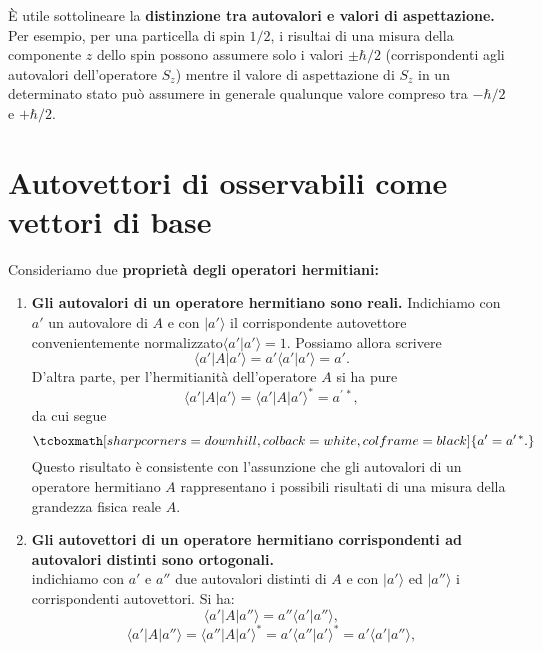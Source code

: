 È utile sottolineare la \textbf{distinzione tra autovalori e valori di aspettazione.} Per esempio, per una particella di spin $1/2$, i risultai di una misura della componente $z$ dello spin possono assumere solo i valori $\pm \hbar/2$ (corrispondenti agli autovalori dell'operatore $S_z$) mentre il valore di aspettazione di $S_z$ in un determinato stato può assumere in generale qualunque valore compreso tra $-\hbar /2$ e $+\hbar /2$.
\section{Autovettori di osservabili come vettori di base}
Consideriamo due \textbf{proprietà degli operatori hermitiani:}
\begin{enumerate}
\item \textbf{Gli autovalori di un operatore hermitiano sono reali.} Indichiamo con $a'$ un autovalore di $A$ e con $\vert a' \rangle $ il corrispondente autovettore convenientemente normalizzato$\langle a' \vert a' \rangle =1 $. Possiamo allora scrivere
	\begin{equation}
		\langle a' \vert A \vert a' \rangle = a' \langle a' \vert a' \rangle = a'.
	\end{equation}
D'altra parte, per l'hermitianità dell'operatore $A$ si ha pure
	\begin{equation}
		\langle a' \vert A \vert a' \rangle = \langle a' \vert A \vert a' \rangle  ^* = a^{\prime \, *},
	\end{equation}
da cui segue
	\begin{equation}
		\tcboxmath[sharp corners=downhill, colback=white, colframe=black]{
			a'=a^{\prime \, *} .
			}
	\end{equation}
Questo risultato è consistente con l'assunzione che gli autovalori di un operatore hermitiano $A$ rappresentano i possibili risultati di una misura della grandezza fisica reale $A$.
\item \textbf{Gli autovettori di un operatore hermitiano corrispondenti ad autovalori distinti sono ortogonali.}\\
indichiamo con $a' $ e $a''$ due autovalori distinti di $A$ e con $\vert a' \rangle$ ed $\vert a'' \rangle$ i corrispondenti autovettori. Si ha:
	\begin{equation}
		\langle a' \vert A \vert a'' \rangle = a'' \langle a' \vert a'' \rangle ,
	\end{equation}
	\begin{equation}
		\langle a' \vert A \vert a'' \rangle = \langle a'' \vert A \vert a' \rangle ^* = a' \langle a'' \vert a' \rangle ^* = a' \langle a' \vert a'' \rangle ,

\end{equation}
\end{enumerate}
